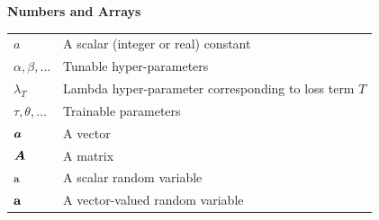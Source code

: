 \documentclass[a4paper,twoside,openright]{book}
\theoremstyle{plain}
\theoremstyle{definition}
\begin{document}
\centerline{\bf Numbers and Arrays}
\nopagebreak
\begin{tabular}{p{2cm}p{11cm}}
	$\displaystyle a$ & A scalar (integer or real) constant\\
	$\displaystyle \alpha, \beta, \dots$ & Tunable hyper-parameters\\
	$\displaystyle \lambda_{T}$ & Lambda hyper-parameter corresponding to loss term $T$\\
	$\displaystyle \tau, \theta, \dots$ & Trainable parameters\\
	$\displaystyle {\bm{a}}$ & A vector\\
	$\displaystyle {\bm{A}}$ & A matrix\\
	$\displaystyle {\textnormal{a}}$ & A scalar random variable\\
	$\displaystyle {\mathbf{a}}$ & A vector-valued random variable\\
\end{tabular}
\vspace{0.5cm}
\end{document}
